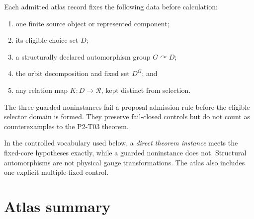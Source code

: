 \documentclass[11pt]{article}
\begin{document}
Each admitted atlas record fixes the following data before calculation:
\begin{enumerate}[label=(H\arabic*)]
  \item one finite source object or represented component;
  \item its eligible-choice set \(D\);
  \item a structurally declared automorphism group \(G\curvearrowright D\);
  \item the orbit decomposition and fixed set \(D^G\); and
  \item any relation map \(K:D\to\mathcal R\), kept distinct from selection.
\end{enumerate}
The three guarded noninstances fail a proposal admission rule before the
eligible selector domain is formed. They preserve fail-closed controls but do
not count as counterexamples to the P2-T03 theorem.

In the controlled vocabulary used below, a \emph{direct theorem instance}
meets the fixed-core hypotheses exactly, while a guarded noninstance does not.
Structural automorphisms are not physical gauge transformations. The atlas
also includes one explicit multiple-fixed control.

\section{Atlas summary}
\end{document}
